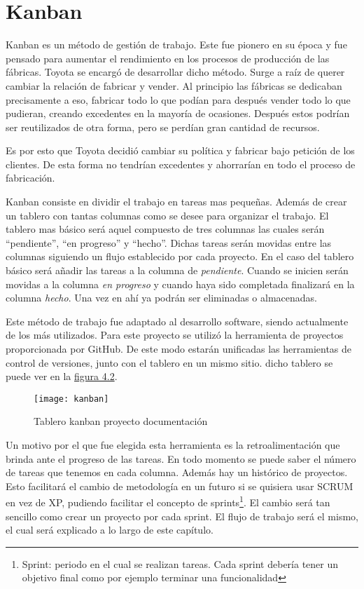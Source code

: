 \section{Kanban}

Kanban es un método de gestión de trabajo. Este fue pionero en su época y fue pensado para
aumentar el rendimiento en los procesos de producción de las fábricas. Toyota se encargó
de desarrollar dicho método. Surge a raíz de querer cambiar la relación de fabricar y vender.
Al principio las fábricas se dedicaban precisamente a eso, fabricar todo lo que podían
para después vender todo lo que pudieran, creando excedentes en la mayoría de ocasiones. Después
estos podrían ser reutilizados de otra forma, pero se perdían gran cantidad de recursos.

Es por esto que Toyota decidió cambiar su política y fabricar bajo petición de los clientes. De
esta forma no tendrían excedentes y ahorrarían en todo el proceso de fabricación.

Kanban consiste en dividir el trabajo en tareas mas pequeñas. Además de crear un tablero
con tantas columnas como se desee para organizar el trabajo.
El tablero mas básico será aquel compuesto de tres columnas las cuales serán \enquote{pendiente},
\enquote{en progreso} y \enquote{hecho}. Dichas tareas serán movidas entre las columnas siguiendo un flujo
establecido por cada proyecto. En el caso del tablero básico será añadir las tareas a la columna
de \textit{pendiente}. Cuando se inicien serán movidas a la columna \textit{en progreso} y cuando haya sido completada
finalizará en la columna \textit{hecho}. Una vez en ahí ya podrán ser eliminadas o
almacenadas.

Este método de trabajo fue adaptado al desarrollo software, siendo actualmente de los más utilizados.
Para este proyecto se utilizó la herramienta de proyectos proporcionada por GitHub. De este modo
estarán unificadas las herramientas de control de versiones, junto con el tablero en un mismo sitio.
dicho tablero se puede ver en la \hyperref[fig:Tablero kanban proyecto documentación]{figura 4.2}.

\begin{figure}[htb]
  \centering
    \texttt{[image: kanban]}
  \caption[Tablero kanban proyecto documentación]{Tablero kanban proyecto documentación}
  \label{fig:Tablero kanban proyecto documentación}
\end{figure}

Un motivo por el que fue elegida esta herramienta es la retroalimentación que brinda ante
el progreso de las tareas. En todo momento se puede saber el número de tareas que tenemos
en cada columna. Además hay un histórico de proyectos. Esto facilitará el cambio de metodología
en un futuro si se quisiera usar SCRUM en vez de XP, pudiendo facilitar
el concepto de sprints\footnote{Sprint: periodo en el cual se realizan tareas. Cada sprint debería tener un objetivo final como por ejemplo terminar una funcionalidad}. El cambio será tan sencillo como crear un proyecto por cada sprint.
El flujo de trabajo será el mismo, el cual será explicado a lo largo de este capítulo.

